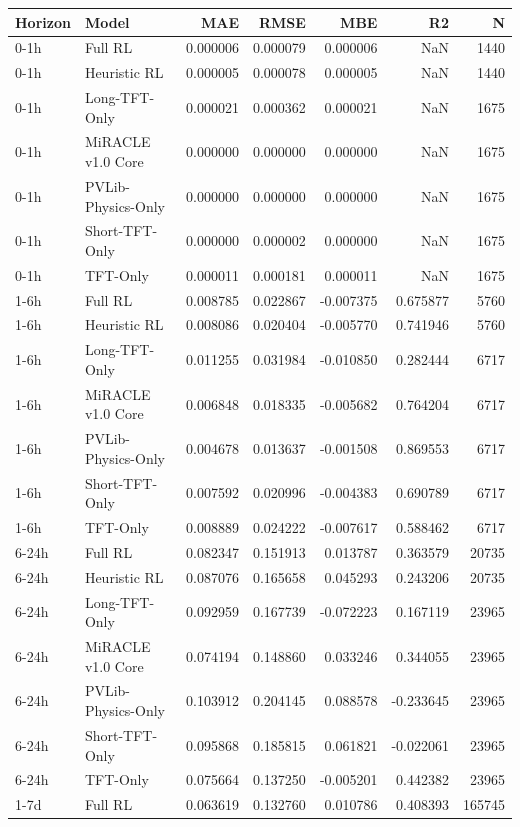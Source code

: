 \begin{tabular}{llrrrrr}
\toprule
Horizon & Model & MAE & RMSE & MBE & R2 & N \\
\midrule
0-1h & Full RL & 0.000006 & 0.000079 & 0.000006 & NaN & 1440 \\
0-1h & Heuristic RL & 0.000005 & 0.000078 & 0.000005 & NaN & 1440 \\
0-1h & Long-TFT-Only & 0.000021 & 0.000362 & 0.000021 & NaN & 1675 \\
0-1h & MiRACLE v1.0 Core & 0.000000 & 0.000000 & 0.000000 & NaN & 1675 \\
0-1h & PVLib-Physics-Only & 0.000000 & 0.000000 & 0.000000 & NaN & 1675 \\
0-1h & Short-TFT-Only & 0.000000 & 0.000002 & 0.000000 & NaN & 1675 \\
0-1h & TFT-Only & 0.000011 & 0.000181 & 0.000011 & NaN & 1675 \\
1-6h & Full RL & 0.008785 & 0.022867 & -0.007375 & 0.675877 & 5760 \\
1-6h & Heuristic RL & 0.008086 & 0.020404 & -0.005770 & 0.741946 & 5760 \\
1-6h & Long-TFT-Only & 0.011255 & 0.031984 & -0.010850 & 0.282444 & 6717 \\
1-6h & MiRACLE v1.0 Core & 0.006848 & 0.018335 & -0.005682 & 0.764204 & 6717 \\
1-6h & PVLib-Physics-Only & 0.004678 & 0.013637 & -0.001508 & 0.869553 & 6717 \\
1-6h & Short-TFT-Only & 0.007592 & 0.020996 & -0.004383 & 0.690789 & 6717 \\
1-6h & TFT-Only & 0.008889 & 0.024222 & -0.007617 & 0.588462 & 6717 \\
6-24h & Full RL & 0.082347 & 0.151913 & 0.013787 & 0.363579 & 20735 \\
6-24h & Heuristic RL & 0.087076 & 0.165658 & 0.045293 & 0.243206 & 20735 \\
6-24h & Long-TFT-Only & 0.092959 & 0.167739 & -0.072223 & 0.167119 & 23965 \\
6-24h & MiRACLE v1.0 Core & 0.074194 & 0.148860 & 0.033246 & 0.344055 & 23965 \\
6-24h & PVLib-Physics-Only & 0.103912 & 0.204145 & 0.088578 & -0.233645 & 23965 \\
6-24h & Short-TFT-Only & 0.095868 & 0.185815 & 0.061821 & -0.022061 & 23965 \\
6-24h & TFT-Only & 0.075664 & 0.137250 & -0.005201 & 0.442382 & 23965 \\
1-7d & Full RL & 0.063619 & 0.132760 & 0.010786 & 0.408393 & 165745 \\

\end{tabular}
